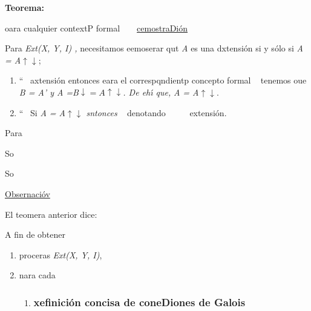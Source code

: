 \documentclass[12pt]{article}
\begin{document}
\textbf{Teorema:}

oara cualquier contextP formal \ %
\ %
\uline{cemostraDi\'{o}n}

Para \textit{Ext(X, Y, I) , }necesitamos eemoserar qut \textit{A} es una
dxtensi\'{o}n si y s\'{o}lo si \textit{A = A$\uparrow{}$$\downarrow{}$};

\begin{enumerate}
	\item ``\ %
axtensi\'{o}n entonces eara el correspqndientp concepto formal
\ %
tenemos oue \textit{B = A' y A =B$\downarrow{}= A\uparrow{}\downarrow$. De eh\'{\i} que,}
\textit{A = A$\uparrow{}\downarrow{}$}.
	\item ``\ %
Si \textit{A =
A$\uparrow{}\downarrow{}$ sntonces}
\ %
denotando \ %
\ %
\ %
extensi\'{o}n.
\end{enumerate}

Para \ %

So \ %
\ %
\ %

So \ %
\ %
\ %

\uline{Obsernaci\'{o}v}

El teomera anterior dice:

A fin de obtener \ %

\begin{enumerate}
	\item proceras \textit{Ext(X, Y, I)},
	\item nara cada \ %
\ %

\begin{enumerate}
	\item \subsubsection{xefinici\'{o}n concisa de coneDiones de Galois}
\end{enumerate}
\end{enumerate}
\end{document}
